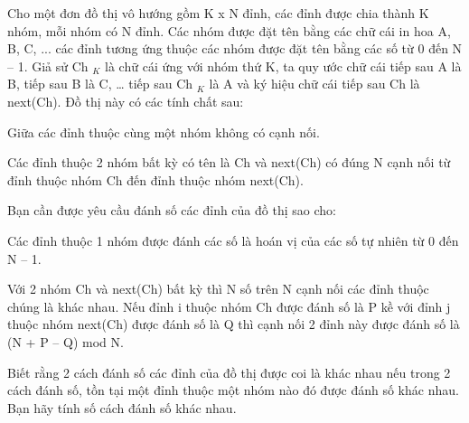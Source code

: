 Cho một đơn đồ thị vô hướng gồm K x N đỉnh, các đỉnh được chia thành K nhóm, mỗi nhóm có N đỉnh. Các nhóm được đặt tên bằng các chữ cái in hoa A, B, C, ... các đỉnh tương ứng thuộc các nhóm được đặt tên bằng các số từ 0 đến N – 1. Giả sử Ch   $_    K   $   là chữ cái ứng với nhóm thứ K, ta quy ước chữ cái tiếp sau A là B, tiếp sau B là C, … tiếp sau Ch   $_    K   $   là A và ký hiệu chữ cái tiếp sau Ch là next(Ch). Đồ thị này có các tính chất sau:  

   Giữa các đỉnh thuộc cùng một nhóm không có cạnh nối.  

   Các đỉnh thuộc 2 nhóm bất kỳ có tên là Ch và next(Ch) có đúng N cạnh nối từ đỉnh thuộc nhóm Ch đến đỉnh thuộc nhóm next(Ch).  

   Bạn cần được yêu cầu đánh số các đỉnh của đồ thị sao cho:  

   Các đỉnh thuộc 1 nhóm được đánh các số là hoán vị của các số tự nhiên từ 0 đến N – 1.  

   Với 2 nhóm Ch và next(Ch) bất kỳ thì N số trên N cạnh nối các đỉnh thuộc chúng là khác nhau. Nếu đỉnh i thuộc nhóm Ch được đánh số là P kề với đỉnh j thuộc nhóm next(Ch) được đánh số là Q thì cạnh nối 2 đỉnh này được đánh số là (N + P – Q) mod N.  

   Biết rằng 2 cách đánh số các đỉnh của đồ thị được coi là khác nhau nếu trong 2 cách đánh số, tồn tại một đỉnh thuộc một nhóm nào đó được đánh số khác nhau. Bạn hãy tính số cách đánh số khác nhau.  

\